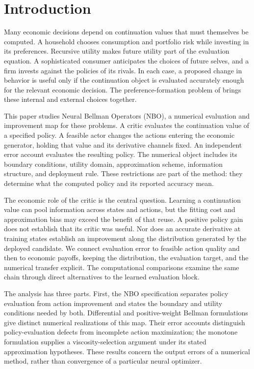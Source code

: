 \section{Introduction}\label{sec:introduction}
Many economic decisions depend on continuation values that must themselves be computed. A household chooses consumption and portfolio risk while investing in its preferences. Recursive utility makes future utility part of the evaluation equation. A sophisticated consumer anticipates the choices of future selves, and a firm invests against the policies of its rivals. In each case, a proposed change in behavior is useful only if the continuation object is evaluated accurately enough for the relevant economic decision. The preference-formation problem of \citet{qi2025} brings these internal and external choices together.

This paper studies Neural Bellman Operators (NBO), a numerical evaluation and improvement map for these problems. A critic evaluates the continuation value of a specified policy. A feasible actor changes the actions entering the economic generator, holding that value and its derivative channels fixed. An independent error account evaluates the resulting policy. The numerical object includes its boundary conditions, utility domain, approximation scheme, information structure, and deployment rule. These restrictions are part of the method: they determine what the computed policy and its reported accuracy mean.

The economic role of the critic is the central question. Learning a continuation value can pool information across states and actions, but the fitting cost and approximation bias may exceed the benefit of that reuse. A positive policy gain does not establish that its critic was useful. Nor does an accurate derivative at training states establish an improvement along the distribution generated by the deployed candidate. We connect evaluation error to feasible action quality and then to economic payoffs, keeping the distribution, the evaluation target, and the numerical transfer explicit. The computational comparisons examine the same chain through direct alternatives to the learned evaluation block.

The analysis has three parts. First, the NBO specification separates policy evaluation from action improvement and states the boundary and utility conditions needed by both. Differential and positive-weight Bellman formulations give distinct numerical realizations of this map. Their error accounts distinguish policy-evaluation defects from incomplete action maximization; the monotone formulation supplies a viscosity-selection argument under its stated approximation hypotheses. These results concern the output errors of a numerical method, rather than convergence of a particular neural optimizer.

